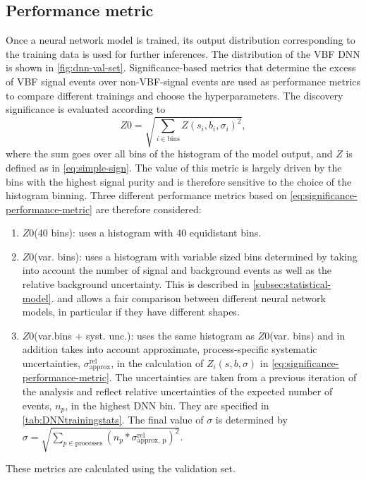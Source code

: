 \subsection{Performance metric}
Once a neural network model is trained, its output distribution corresponding to the training data is used for further inferences. The distribution of the VBF DNN is shown in \cref{fig:dnn-val-set}. 
Significance-based metrics that determine the excess of VBF signal events over non-VBF-signal events are used as performance metrics to compare different trainings and choose the hyperparameters.
The discovery significance is evaluated according to
\begin{equation}
    \label{eq:significance-performance-metric}
    Z0 = \sqrt{ \sum_{i \in \text{bins}} Z(s_{i}, b_{i}, \sigma_{i})^2 },
\end{equation}
where the sum goes over all bins of the histogram of the model output, and $Z$ is defined as in \cref{eq:simple-sign}.
The value of this metric is largely driven by the bins with the highest signal purity and is therefore sensitive to the choice of the histogram binning.
Three different performance metrics based on \cref{eq:significance-performance-metric} are therefore considered:
\begin{enumerate}
    \item $Z0$(40 bins): uses a histogram with 40 equidistant bins.
    \item $Z0$(var. bins): uses a histogram with variable sized bins determined by taking into account the number of signal and background events as well as the relative background uncertainty. This is described in  \cref{subsec:statistical-model}. and allows a fair comparison between different neural network models, in particular if they have different shapes. 
    \item $Z0$(var.bins + syst. unc.): uses the same histogram as $Z0$(var. bins) and in addition takes into account approximate, process-specific systematic uncertainties, $\sigma_{\text{approx}}^\text{rel}$, in the calculation of $Z_{i}(s, b, \sigma)$ in \cref{eq:significance-performance-metric}. The uncertainties are taken from a previous iteration of the analysis and reflect relative uncertainties of the expected number of events, $n_p$, in the highest DNN bin. They are specified in \cref{tab:DNNtrainingstats}. The final value of $\sigma$ is determined by $\sigma = \sqrt{ \sum_{p \in \text{processes}} \left( n_p * \sigma_\text{approx, p}^\text{rel} \right)^2}$. 
\end{enumerate}
These metrics are calculated using the validation set. 

